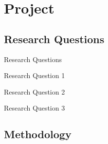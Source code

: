 
\section{Project}
\subsection{Research Questions}

\def\rqa{\begin{alertblock}{Research Question 1}
        \rqatext{}
    \end{alertblock}
}

\def\rqb{\begin{alertblock}{Research Question 2}
        \rqbtext{}
    \end{alertblock}
}

\def\rqc{\begin{alertblock}{Research Question 3}
        \rqctext{}
    \end{alertblock}
}

\begin{frame}{Research Questions}
    \rqa{} \vspace*{\fill}
    \rqb{} \vspace*{\fill}
    \rqc{} \vspace*{\fill}
    \vspace{0.2cm}
\end{frame}

\subsection{Methodology}

